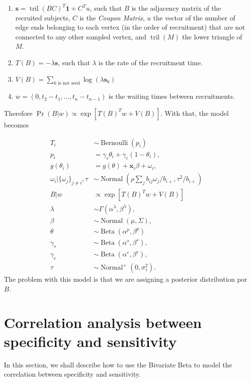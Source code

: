 \documentclass[a4paper, notitlepage, 11pt]{article}
\newcommand{\x}{\boldsymbol{x}}
\newcommand{\N}{\operatorname{Normal}}
\newcommand{\betadist}{\operatorname{Beta}}
\newcommand{\tril}{\operatorname{tril}}
\theoremstyle{definition}
\theoremstyle{remark}
\begin{document}
\begin{enumerate}
  \item $\boldsymbol{s} = \tril(BC)^T \boldsymbol{1} + C^Tu$, such that $B$ is the
  adjacency matrix of the recruited subjects, $C$ is the {\em Coupon Matrix},
  $u$ the vector of the number of edge ends belonging to each vertex
  (in the order of recruitment) that are not connected to any other sampled
  vertex, and $\tril(M)$ the lower triangle of $M$. 

  \item $T(B) = -\lambda \boldsymbol{s}$, such that $\lambda$ is the rate of
  the recruitment time. 

  \item $V(B) = \sum_{k \text{ is not seed}} \log(\lambda \boldsymbol{s}_k)$
  
  \item $w = (0, t_2 - t_1, ..., t_n - t_{n-1})$ is the waiting times between
  recruitments.  
\end{enumerate}

Therefore $\Pr(B|w) \propto \exp[T(B)^Tw + V(B)]$. With that, the model
becomes 

\begin{equation}
  \begin{aligned}
    T_i &\sim \operatorname{Bernoulli}(p_i) \\
    p_i &= \gamma_s\theta_i + \gamma_e(1 - \theta_i),  \\
    g(\theta_i) &= g(\theta) + \x_i\beta + \omega_i,  \\
    \omega_i|\{\omega_j\}_{j\neq i}, \tau &\sim \N\left(\rho\sum_j b_{ij}\omega_j/b_{i+}, \tau^2/b_{i+}\right) \\
    B|w &\propto \exp[T(B)^Tw + V(B)] \\
    \lambda &\sim \Gamma(\alpha^{\lambda}, \beta^{\lambda}), \\ 
    \beta &\sim \N(\mu, \Sigma), \\ 
    \theta &\sim \betadist(\alpha^p, \beta^p) \\
    \gamma_s &\sim \betadist(\alpha^s, \beta^s), \\
    \gamma_e &\sim \betadist(\alpha^e, \beta^e), \\  
    \tau &\sim \N^+(0,\sigma^2_{\tau}).
  \end{aligned}  
\end{equation}
The problem with this model is that we are assigning a posterior distribution
por $B$.


\section{Correlation analysis between specificity and sensitivity}

In this section, we shall describe how to use the Bivariate Beta
\cite{olkin2015constructions} to model the correlation between specificity and
sensitivity.

 
\end{document}
